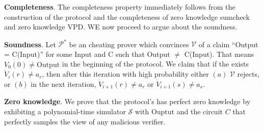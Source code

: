 \noindent
\textbf{Completeness}. The completeness property immediately follows from the construction of the protocol and the completeness of zero knowledge sumcheck and zero knowledge VPD. WE now proceed to argue about the soundness.

\noindent
\textbf{Soundness}. Let $\mathcal{P}^*$ be an cheating prover which convinces $\mathcal{V}$ of a claim ``Output = C(Input)'' for some Input and C such that Output $\neq$ C(Input). That means $\dot{V_0(0)} \neq \text{Output}$ in the beginning of the protocol. We claim that if the exists $\dot{V}_i(r) \neq a_r$, then after this iteration with high probability either $(a)$ $\mathcal{V}$ rejects, or $(b)$ in the next iteration, $\dot{V}_{i+1}(r) \neq a_r$ or $\dot{V}_{i+1}(s) \neq a_s$.

\noindent
\textbf{Zero knowledge}. We prove that the protocol's has perfect zero knowledge by exhibiting a polynomial-time simulator $\mathcal{S}$ with $\text{Ouptut}$ and the circuit $C$ that perfectly samples the view of any malicious verifier. 

